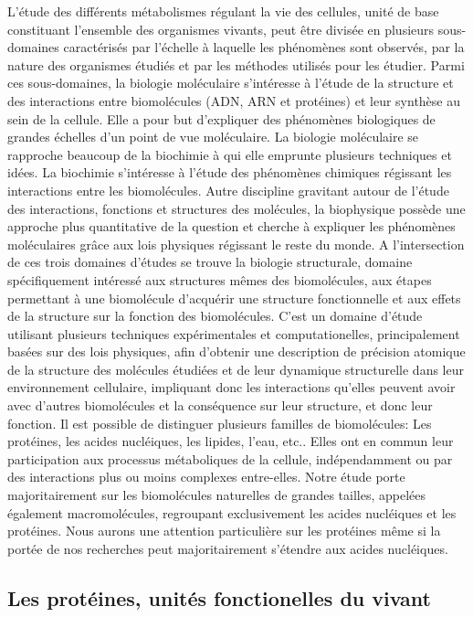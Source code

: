L'étude des différents métabolismes régulant la vie des cellules, unité de base constituant l'ensemble des organismes vivants, peut être divisée en plusieurs sous-domaines caractérisés par l'échelle à laquelle les phénomènes sont observés, par la nature des organismes étudiés et par les méthodes utilisés pour les étudier. Parmi ces sous-domaines, la biologie moléculaire s'intéresse à l'étude de la structure et des interactions entre biomolécules (ADN, ARN et protéines) et leur synthèse au sein de la cellule. Elle a pour but d'expliquer des phénomènes biologiques de grandes échelles d'un point de vue moléculaire. La biologie moléculaire se rapproche beaucoup de la biochimie à qui elle emprunte plusieurs techniques et idées. La biochimie s'intéresse à l'étude des phénomènes chimiques régissant les interactions entre les biomolécules. Autre discipline gravitant autour de l'étude des interactions, fonctions et structures des molécules, la biophysique possède une approche plus quantitative de la question et cherche à expliquer les phénomènes moléculaires grâce aux lois physiques régissant le reste du monde. A l'intersection de ces trois domaines d'études se trouve la biologie structurale, domaine spécifiquement intéressé aux structures mêmes des biomolécules, aux étapes permettant à une biomolécule d'acquérir une structure fonctionnelle et aux effets de la structure sur la fonction des biomolécules. C'est un domaine d'étude utilisant plusieurs techniques expérimentales et computationelles, principalement basées sur des lois physiques, afin d'obtenir une description de précision atomique de la structure des molécules étudiées et de leur dynamique structurelle dans leur environnement cellulaire, impliquant donc les interactions qu'elles peuvent avoir avec d'autres biomolécules et la conséquence sur leur structure, et donc leur fonction.
Il est possible de distinguer plusieurs familles de biomolécules: Les protéines, les acides nucléiques, les lipides, l'eau, etc.. Elles ont en commun leur participation aux processus métaboliques de la cellule, indépendamment ou par des interactions plus ou moins complexes entre-elles. Notre étude porte majoritairement sur les biomolécules naturelles de grandes tailles, appelées également macromolécules, regroupant exclusivement les acides nucléiques et les protéines. Nous aurons une attention particulière sur les protéines même si la portée de nos recherches peut majoritairement s'étendre aux acides nucléiques.

\subsection{Les protéines, unités fonctionelles du vivant}

